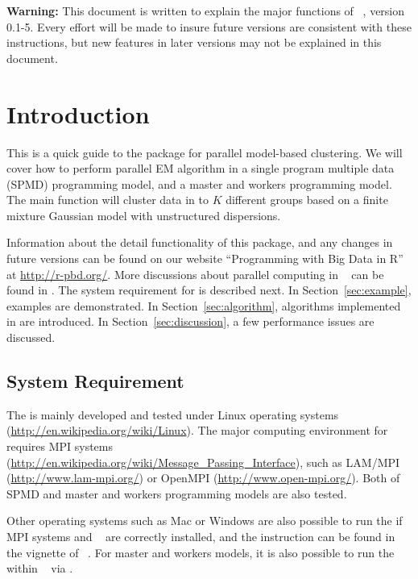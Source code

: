 
{\color{red} \bf Warning:} This document is written to explain the major
functions of
~\citep{Chen2012pmclustpackage}, version 0.1-5.
Every effort will be made to insure future versions are consistent with
these instructions, but new features in later versions may not be explained
in this document.


\section[Introduction]{Introduction}
\label{sec:introduction}

This is a quick guide to the package  for
parallel model-based clustering.
We will cover how to perform parallel EM algorithm in 
a single program multiple data (SPMD) programming model,
and a master and workers programming model.
The main function  will cluster
data in to $K$ different groups based on a finite mixture Gaussian
model with unstructured dispersions.

Information about the detail functionality of this package,
and any changes in future versions can be found on our website
``Programming with Big Data in R'' at
\url{http://r-pbd.org/}.
More discussions about parallel computing in ~\citep{Rcore}
can be found in \citet{Schmidberger2009}.
The system requirement for  is described next.
In Section~\ref{sec:example}, examples are demonstrated.
In Section~\ref{sec:algorithm}, algorithms implemented in 
are introduced. In Section~\ref{sec:discussion}, a few performance issues
are discussed.




\subsection[System Requirement]{System Requirement}
\label{sec:system_requirement}

The  is mainly developed and tested under Linux operating systems
(\url{http://en.wikipedia.org/wiki/Linux}).
The major computing environment for  requires MPI systems
(\url{http://en.wikipedia.org/wiki/Message_Passing_Interface}), such as
LAM/MPI (\url{http://www.lam-mpi.org/}) or
OpenMPI (\url{http://www.open-mpi.org/}).
Both of SPMD and master and workers programming models are also tested.

Other operating systems such as Mac or Windows are also possible to run the
 if MPI systems and ~\citep{Chen2012pbdMPIpackage}
are correctly installed, and the instruction can be found in
the vignette of ~\citep{Chen2014pbdMPIvignette}.
For master and workers models,
it is also possible to run the  within ~\citep{Yu2010}
via .

